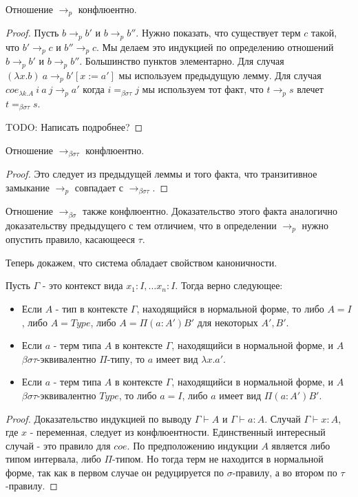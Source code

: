 \documentclass{amsart}
\theoremstyle{definition}
\theoremstyle{remark}
\newcommand{\bs}{\beta\sigma}
\newcommand{\rbs}{\to_{\bs}}
\newcommand{\bst}{\bs\tau}
\newcommand{\ebst}{=_{\bst}}
\newcommand{\rbst}{\to_{\bst}}
\numberwithin{figure}{section}
\begin{document}
\begin{lem}
Отношение $\to_p$ конфлюентно.
\end{lem}
\begin{proof}
Пусть $b \to_p b'$ и $b \to_p b''$.
Нужно показать, что существует терм $c$ такой, что $b' \to_p c$ и $b'' \to_p c$.
Мы делаем это индукцией по определению отношений $b \to_p b'$ и $b \to_p b''$.
Большинство пунктов элементарно.
Для случая $(\lambda x. b)\ a \to_p b'[x := a']$ мы используем предыдущую лемму.
Для случая $coe_{\lambda k. A}\ i\ a\ j \to_p a'$ когда $i \ebst j$ мы используем тот факт, что $t \to_p s$ влечет $t \ebst s$.

TODO: Написать подробнее?
\end{proof}

\begin{prop}
Отношение $\rbst$ конфлюентно.
\end{prop}
\begin{proof}
Это следует из предыдущей леммы и того факта, что транзитивное замыкание $\to_p$ совпадает с $\rbst$.
\end{proof}

\begin{remark}
Отношение $\rbs$ также конфлюентно.
Доказательство этого факта аналогично доказательству предыдущего с тем отличием, что в определении $\to_p$ нужно опустить правило, касающееся $\tau$.
\end{remark}

Теперь докажем, что система обладает свойством каноничности.

\begin{prop}
Пусть $\Gamma$ - это контекст вида $x_1 : I, \ldots x_n : I$.
Тогда верно следующее:
\begin{itemize}
\item Если $A$ - тип в контексте $\Gamma$, находящийся в нормальной форме, то либо $A = I$, либо $A = Type$, либо $A = \Pi (a : A') B'$ для некоторых $A',B'$.
\item Если $a$ - терм типа $A$ в контексте $\Gamma$, находящийси в нормальной форме, и $A$ $\bst$-эквивалентно $\Pi$-типу, то $a$ имеет вид $\lambda x. a'$.
\item Если $a$ - терм типа $A$ в контексте $\Gamma$, находящийси в нормальной форме, и $A$ $\bst$-эквивалентно $Type$, то либо $a = I$, либо $a$ имеет вид $\Pi (a : A') B'$.
\end{itemize}
\end{prop}
\begin{proof}
Доказательство индукцией по выводу $\Gamma \vdash A$ и $\Gamma \vdash a : A$.
Случай $\Gamma \vdash x : A$, где $x$ - переменная, следует из конфлюентности.
Единственный интересный случай - это правило для $coe$.
По предположению индукции $A$ является либо типом интервала, либо $\Pi$-типом.
Но тогда терм не находится в нормальной форме, так как в первом случае он редуцируется по $\sigma$-правилу, а во втором по $\tau$-правилу.
\end{proof}
\end{document}
